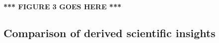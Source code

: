 \documentclass[10pt]{article}
\begin{document}
%

\textbf{*** FIGURE 3 GOES HERE ***}

\subsection*{Comparison of derived scientific insights}
\label{sec:overall}
\end{document}
